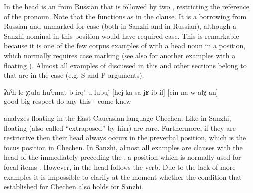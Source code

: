 In  the head is an  from Russian that is followed by two , restricting the reference of the pronoun. Note that the  functions as  in the clause. It is a borrowing from Russian and unmarked for case (both in Sanzhi and in Russian), although a Sanzhi nominal in this position would have required  case. This is remarkable because it is one of the few corpus examples of  with a head noun in a position, which normally requires case marking (see also  for another examples with a floating ). Almost all examples of  discussed in this and other sections belong to  that are in the  case (e.g. S and P arguments).
%
\begin{exe}
	\ex	\label{ex:‎He gives respect to anybody who comes here, whom he knows}
	\gll	ʡaˁħ-le	χːula	ħuˁrmat	b-irq'-u	lubuj		[hej-ka	sa-jʁ-ib-il]	[cin-na	w-alχ-an]\\
		good	big	respect	do	any	this-	-come		know\\
	\glt	{}
\end{exe}

\citet{Komen2014} analyzes floating  in the East Caucasian language Chechen. Like in Sanzhi, floating (also called ``extraposed'' by him)  are rare. Furthermore, if they are restrictive then their head always occurs in the preverbal position, which is the focus position in Chechen. In Sanzhi, almost all examples are  clauses with the head of the  immediately preceding the , a position which is normally used for focal items . However, in  the head follows the verb. Due to the lack of more examples it is impossible to clarify at the moment whether the condition that \citet{Komen2014} established for Chechen also holds for Sanzhi.



